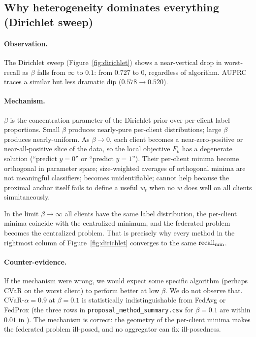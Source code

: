 \subsection{Why heterogeneity dominates everything (Dirichlet sweep)}
\label{sec:mechanism-dirichlet}

\paragraph{Observation.} The Dirichlet sweep
(Figure~\ref{fig:dirichlet}) shows a near-vertical drop in worst-recall as
$\beta$ falls from $\infty$ to $0.1$: from $0.727$ to $0$, regardless of
algorithm. AUPRC traces a similar but less dramatic dip ($0.578 \to 0.520$).

\paragraph{Mechanism.} $\beta$ is the concentration parameter of the Dirichlet
prior over per-client label proportions. Small $\beta$ produces nearly-pure
per-client distributions; large $\beta$ produces nearly-uniform. As
$\beta \to 0$, each client becomes a near-zero-positive or near-all-positive
slice of the data, so the local objective $F_k$ has a degenerate solution
(``predict $y\!=\!0$'' or ``predict $y\!=\!1$''). Their per-client minima
become orthogonal in parameter space; size-weighted averages of orthogonal
minima are not meaningful classifiers; \fedavg{} becomes unidentifiable;
\fedprox{} cannot help because the proximal anchor itself fails to define a
useful $w_t$ when no $w$ does well on all clients simultaneously.

In the limit $\beta \to \infty$ all clients have the same label distribution,
the per-client minima coincide with the centralized minimum, and the federated
problem becomes the centralized problem. That is precisely why every method
in the rightmost column of Figure~\ref{fig:dirichlet} converges to the same
$\text{recall}_{\min}{}$.

\paragraph{Counter-evidence.} If the mechanism were wrong, we would expect
some specific algorithm (perhaps CVaR on the worst client) to perform better
at low $\beta$. We do not observe that. CVaR-$\alpha\!=\!0.9$ at $\beta\!=\!0.1$
is statistically indistinguishable from FedAvg or FedProx (the three rows in
\texttt{proposal\_method\_summary.csv} for $\beta\!=\!0.1$ are within $0.01$
in \auprc{}). The mechanism is correct: the geometry of the per-client minima
makes the federated problem ill-posed, and no aggregator can fix
ill-posedness.

